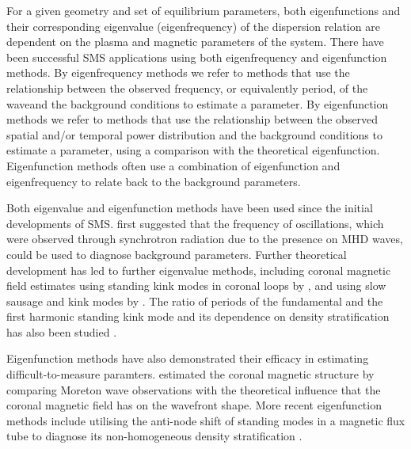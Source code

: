 \documentclass[namedreferences]{solarphysics}
\numberwithin{equation}{section}
\begin{document}
\begin{article}
For a given geometry and set of equilibrium parameters, both eigenfunctions and their corresponding eigenvalue (eigenfrequency) of the dispersion relation are dependent on the plasma and magnetic parameters of the system. There have been successful SMS applications using both eigenfrequency and eigenfunction methods. By eigenfrequency methods we refer to methods that use the relationship between the observed frequency, or equivalently period, of the waveand the background conditions to estimate a parameter. By eigenfunction methods we refer to methods that use the relationship between the observed spatial and/or temporal power distribution and the background conditions to estimate a parameter, using a comparison with the theoretical eigenfunction. Eigenfunction methods often use a combination of eigenfunction and eigenfrequency to relate back to the background parameters.

Both eigenvalue and eigenfunction methods have been used since the initial developments of SMS. \cite{ros70} first suggested that the frequency of oscillations, which were observed through synchrotron radiation due to the presence on MHD waves, could be used to diagnose background parameters. Further theoretical development has led to further eigenvalue methods, including coronal magnetic field estimates using standing kink modes in coronal loops by \cite{nak_etal01}, and using slow sausage and kink modes by \cite{erd_etal08}. The ratio of periods of the fundamental and the first harmonic standing kink mode and its dependence on density stratification has also been studied \citep{ban_etal07,erd_etal14}.

Eigenfunction methods have also demonstrated their efficacy in estimating difficult-to-measure paramters. \cite{uch70} estimated the coronal magnetic structure by comparing Moreton wave observations with the theoretical influence that the coronal magnetic field has on the wavefront shape. More recent eigenfunction methods include utilising the anti-node shift of standing modes in a magnetic flux tube to diagnose its non-homogeneous density stratification \citep{ver_etal07,erd_etal14}.


\end{article}
\end{document}
